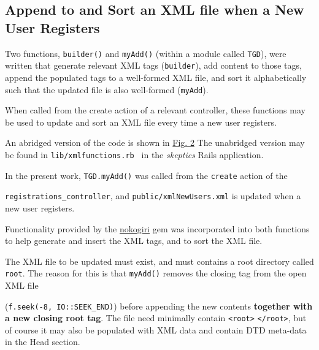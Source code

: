 \documentclass[11pt]{article}
\begin{document}
\hypertarget{label:sectappendsort}{ \subsection{Append to and Sort an XML file when a New User Registers}\label{label:appendsort}}

Two functions, \verb|builder()| and \verb|myAdd()| (within a module called \verb|TGD|), were
written that
generate relevant XML tags (\verb|builder|), 
add content to those tags, 
append the populated tags to a well-formed XML file,
and sort it alphabetically such that the updated file is also well-formed (\verb|myAdd|).

When called from the create action of a relevant controller,
these functions may be used to update and sort an XML file
every time a new user registers.

An abridged version of the code is shown in \hyperlink{label:figxmlfns}{Fig. 2}  
The unabridged version may be found in \verb|lib/xmlfunctions.rb | in the \textit{skeptics}
Rails application. 
 
In the present work, \verb|TGD.myAdd()| was called
from the \verb|create| action of the 

\noindent
\verb|registrations_controller|, and
\verb|public/xmlNewUsers.xml| is updated when a new user registers.

Functionality provided by the  \href{http://rubygems.org/gems/nokogiri}{nokogiri} gem was incorporated into
both functions to help generate and insert the XML tags, 
and to sort the XML file. 

The XML file to be updated must exist, 
and must contains a root directory called \verb|root|. 
The reason for this is that \verb|myAdd()| removes the closing tag
from the open XML file 

\noindent
(\verb|f.seek(-8, IO::SEEK_END)|) 
before appending the new contents 
\textbf{together with a new closing root tag}. 
The file need minimally
contain \verb|<root>|
     \verb|</root>|, but of course it may also be populated with XML data
and contain DTD meta-data in the Head section.
\end{document}
